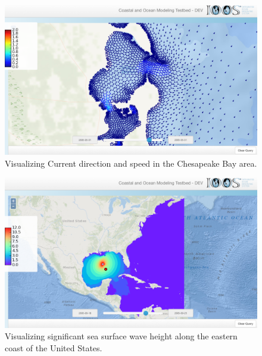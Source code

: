 \begin{figure}[ht!]
  \centering
  \includegraphics[width=0.8\columnwidth]{../figs/vims_selfe_ubaratropic_vbaratropic_chesapeake_bay_crop_695_0_2125_1265}
  \caption{Visualizing Current direction and speed in the
    Chesapeake Bay area.}
  \label{fig:vims_selfe_chesapeake}
\end{figure}
\begin{figure}[ht!]
  \centering
  \includegraphics[width=0.8\columnwidth]{../figs/inundation_tropical_VIMS_SELFE_hurricane_rita_2d_final_run_with_waves_sea_surface_wave_significant_height_crop_695_0_2125_1265}
  \caption{Visualizing significant sea surface wave
    height along the eastern coast of the United States.}
  \label{fig:vims_selfe_ssh}
\end{figure}
\fi
\FloatBarrier
